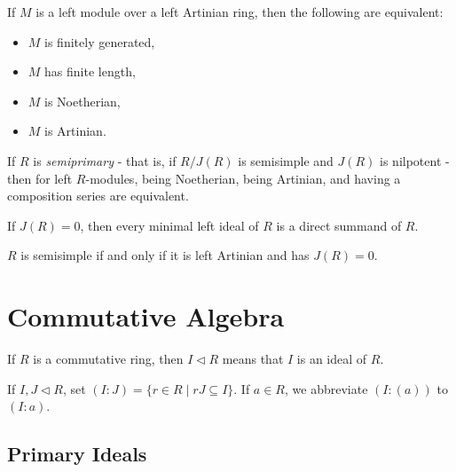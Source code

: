 \begin{thm} If $M$ is a left module over a left Artinian ring, then the following are equivalent:
\begin{itemize}
\item $M$ is finitely generated,
\item $M$ has finite length,
\item $M$ is Noetherian,
\item $M$ is Artinian.
\end{itemize}
\end{thm}

\begin{thm} If $R$ is \emph{semiprimary} - that is, if $R/J(R)$ is semisimple and $J(R)$ is nilpotent - then for left $R$-modules, being Noetherian, being Artinian, and having a composition series are equivalent.
\end{thm}

\begin{prop} If $J(R) = 0$, then every minimal left ideal of $R$ is a direct summand of $R$.
\end{prop}

\begin{thm} $R$ is semisimple if and only if it is left Artinian and has $J(R) = 0$.
\end{thm}






\section{Commutative Algebra}

\begin{defn} If $R$ is a commutative ring, then $I \lhd R$ means that $I$ is an ideal of $R$.
\end{defn}

\begin{defn} If $I,J \lhd R$, set $(I:J) = \{r \in R \mid rJ \subseteq I\}$. If $a \in R$, we abbreviate $(I:(a))$ to $(I:a)$.
\end{defn}

\subsection{Primary Ideals}

